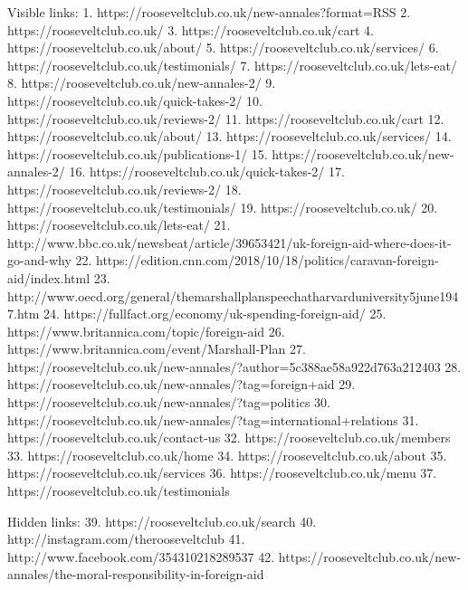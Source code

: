    Visible links:
   1. https://rooseveltclub.co.uk/new-annales?format=RSS
   2. https://rooseveltclub.co.uk/
   3. https://rooseveltclub.co.uk/cart
   4. https://rooseveltclub.co.uk/about/
   5. https://rooseveltclub.co.uk/services/
   6. https://rooseveltclub.co.uk/testimonials/
   7. https://rooseveltclub.co.uk/lets-eat/
   8. https://rooseveltclub.co.uk/new-annales-2/
   9. https://rooseveltclub.co.uk/quick-takes-2/
  10. https://rooseveltclub.co.uk/reviews-2/
  11. https://rooseveltclub.co.uk/cart
  12. https://rooseveltclub.co.uk/about/
  13. https://rooseveltclub.co.uk/services/
  14. https://rooseveltclub.co.uk/publications-1/
  15. https://rooseveltclub.co.uk/new-annales-2/
  16. https://rooseveltclub.co.uk/quick-takes-2/
  17. https://rooseveltclub.co.uk/reviews-2/
  18. https://rooseveltclub.co.uk/testimonials/
  19. https://rooseveltclub.co.uk/
  20. https://rooseveltclub.co.uk/lets-eat/
  21. http://www.bbc.co.uk/newsbeat/article/39653421/uk-foreign-aid-where-does-it-go-and-why
  22. https://edition.cnn.com/2018/10/18/politics/caravan-foreign-aid/index.html
  23. http://www.oecd.org/general/themarshallplanspeechatharvarduniversity5june1947.htm
  24. https://fullfact.org/economy/uk-spending-foreign-aid/
  25. https://www.britannica.com/topic/foreign-aid
  26. https://www.britannica.com/event/Marshall-Plan
  27. https://rooseveltclub.co.uk/new-annales/?author=5c388ae58a922d763a212403
  28. https://rooseveltclub.co.uk/new-annales/?tag=foreign+aid
  29. https://rooseveltclub.co.uk/new-annales/?tag=politics
  30. https://rooseveltclub.co.uk/new-annales/?tag=international+relations
  31. https://rooseveltclub.co.uk/contact-us
  32. https://rooseveltclub.co.uk/members
  33. https://rooseveltclub.co.uk/home
  34. https://rooseveltclub.co.uk/about
  35. https://rooseveltclub.co.uk/services
  36. https://rooseveltclub.co.uk/menu
  37. https://rooseveltclub.co.uk/testimonials

   Hidden links:
  39. https://rooseveltclub.co.uk/search
  40. http://instagram.com/therooseveltclub
  41. http://www.facebook.com/354310218289537
  42. https://rooseveltclub.co.uk/new-annales/the-moral-responsibility-in-foreign-aid
